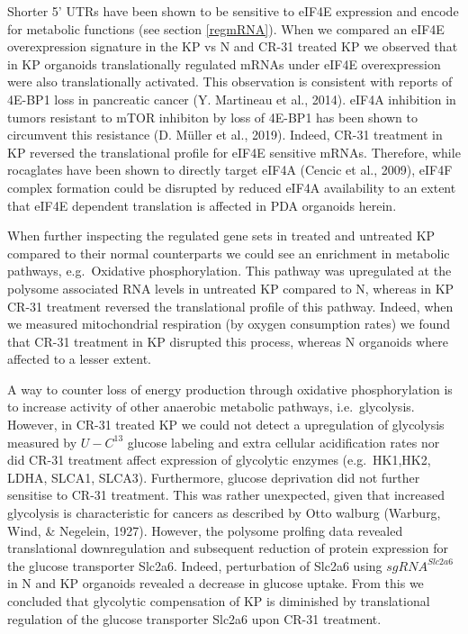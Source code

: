 \documentclass[12pt,openany]{book}
\begin{document}
Shorter 5' UTRs have been shown to be sensitive to eIF4E expression and
encode for metabolic functions (see section \ref{regmRNA}). When we
compared an eIF4E overexpression signature in the KP vs N and CR-31
treated KP we observed that in KP organoids translationally regulated
mRNAs under eIF4E overexpression were also translationally activated.
This observation is consistent with reports of 4E-BP1 loss in pancreatic
cancer (Y. Martineau et al., 2014). eIF4A inhibition in tumors resistant
to mTOR inhibiton by loss of 4E-BP1 has been shown to circumvent this
resistance (D. Müller et al., 2019). Indeed, CR-31 treatment in KP
reversed the translational profile for eIF4E sensitive mRNAs. Therefore,
while rocaglates have been shown to directly target eIF4A (Cencic et
al., 2009), eIF4F complex formation could be disrupted by reduced eIF4A
availability to an extent that eIF4E dependent translation is affected
in PDA organoids herein.

When further inspecting the regulated gene sets in treated and untreated
KP compared to their normal counterparts we could see an enrichment in
metabolic pathways, e.g.~Oxidative phosphorylation. This pathway was
upregulated at the polysome associated RNA levels in untreated KP
compared to N, whereas in KP CR-31 treatment reversed the translational
profile of this pathway. Indeed, when we measured mitochondrial
respiration (by oxygen consumption rates) we found that CR-31 treatment
in KP disrupted this process, whereas N organoids where affected to a
lesser extent.

A way to counter loss of energy production through oxidative
phosphorylation is to increase activity of other anaerobic metabolic
pathways, i.e.~glycolysis. However, in CR-31 treated KP we could not
detect a upregulation of glycolysis measured by \(U-C^{13}\) glucose
labeling and extra cellular acidification rates nor did CR-31 treatment
affect expression of glycolytic enzymes (e.g.~HK1,HK2, LDHA, SLCA1,
SLCA3). Furthermore, glucose deprivation did not further sensitise to
CR-31 treatment. This was rather unexpected, given that increased
glycolysis is characteristic for cancers as described by Otto walburg
(Warburg, Wind, \& Negelein, 1927). However, the polysome prolfing data
revealed translational downregulation and subsequent reduction of
protein expression for the glucose transporter Slc2a6. Indeed,
perturbation of Slc2a6 using \(sgRNA^{Slc2a6}\) in N and KP organoids
revealed a decrease in glucose uptake. From this we concluded that
glycolytic compensation of KP is diminished by translational regulation
of the glucose transporter Slc2a6 upon CR-31 treatment.
\end{document}
